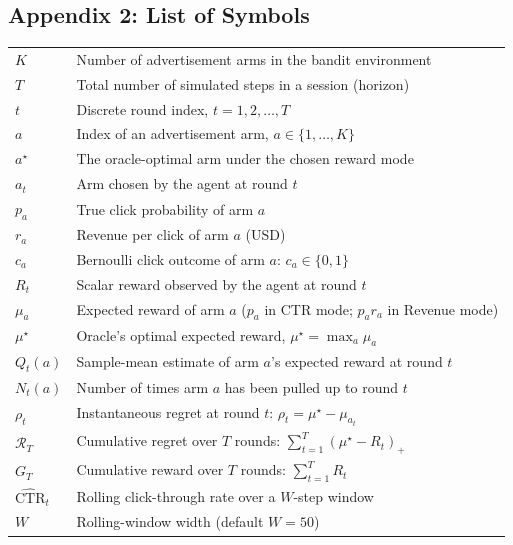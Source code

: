 \subsection*{Appendix 2: List of Symbols}
\renewcommand{\arraystretch}{1.35}
\begin{xltabular}{\linewidth}{@{}p{3.0cm} X@{}}
$K$                 & Number of advertisement arms in the bandit environment\\
$T$                 & Total number of simulated steps in a session (horizon)\\
$t$                 & Discrete round index, $t = 1, 2, \ldots, T$\\
$a$                 & Index of an advertisement arm, $a \in \{1, \ldots, K\}$\\
$a^\star$           & The oracle-optimal arm under the chosen reward mode\\
$a_t$               & Arm chosen by the agent at round $t$\\
$p_a$               & True click probability of arm $a$\\
$r_a$               & Revenue per click of arm $a$ (USD)\\
$c_a$               & Bernoulli click outcome of arm $a$: $c_a \in \{0, 1\}$\\
$R_t$               & Scalar reward observed by the agent at round $t$\\
$\mu_a$             & Expected reward of arm $a$ ($p_a$ in CTR mode; $p_a r_a$ in Revenue mode)\\
$\mu^\star$         & Oracle's optimal expected reward, $\mu^\star = \max_a \mu_a$\\
$Q_t(a)$            & Sample-mean estimate of arm $a$'s expected reward at round $t$\\
$N_t(a)$            & Number of times arm $a$ has been pulled up to round $t$\\
$\rho_t$            & Instantaneous regret at round $t$: $\rho_t = \mu^\star - \mu_{a_t}$\\
$\mathcal{R}_T$     & Cumulative regret over $T$ rounds: $\sum_{t=1}^{T} (\mu^\star - R_t)_+$\\
$G_T$               & Cumulative reward over $T$ rounds: $\sum_{t=1}^{T} R_t$\\
$\widehat{\text{CTR}}_t$ & Rolling click-through rate over a $W$-step window\\
$W$                 & Rolling-window width (default $W = 50$)\\

\end{xltabular}
